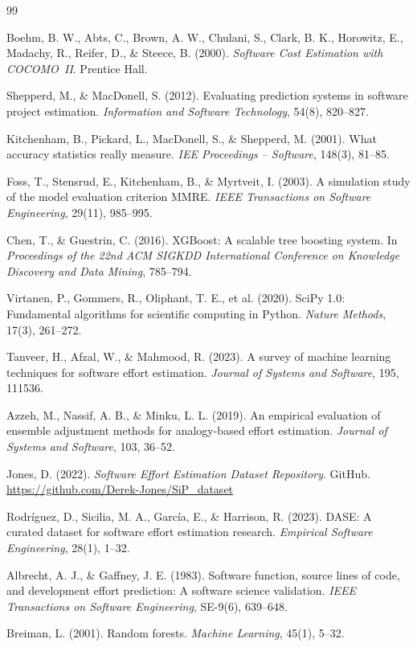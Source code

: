 \documentclass[12pt,a4paper]{article}
\begin{document}
\begin{thebibliography}{99}

Boehm, B. W., Abts, C., Brown, A. W., Chulani, S., Clark, B. K., Horowitz, E., Madachy, R., Reifer, D., \& Steece, B. (2000). \textit{Software Cost Estimation with COCOMO~II}. Prentice Hall.

Shepperd, M., \& MacDonell, S. (2012). Evaluating prediction systems in software project estimation. \textit{Information and Software Technology}, 54(8), 820--827.

Kitchenham, B., Pickard, L., MacDonell, S., \& Shepperd, M. (2001). What accuracy statistics really measure. \textit{IEE Proceedings -- Software}, 148(3), 81--85.

Foss, T., Stensrud, E., Kitchenham, B., \& Myrtveit, I. (2003). A simulation study of the model evaluation criterion MMRE. \textit{IEEE Transactions on Software Engineering}, 29(11), 985--995.

Chen, T., \& Guestrin, C. (2016). XGBoost: A scalable tree boosting system. In \textit{Proceedings of the 22nd ACM SIGKDD International Conference on Knowledge Discovery and Data Mining}, 785--794.

Virtanen, P., Gommers, R., Oliphant, T. E., et al. (2020). SciPy 1.0: Fundamental algorithms for scientific computing in Python. \textit{Nature Methods}, 17(3), 261--272.

Tanveer, H., Afzal, W., \& Mahmood, R. (2023). A survey of machine learning techniques for software effort estimation. \textit{Journal of Systems and Software}, 195, 111536.

Azzeh, M., Nassif, A. B., \& Minku, L. L. (2019). An empirical evaluation of ensemble adjustment methods for analogy-based effort estimation. \textit{Journal of Systems and Software}, 103, 36--52.

Jones, D. (2022). \textit{Software Effort Estimation Dataset Repository}. GitHub. \url{https://github.com/Derek-Jones/SiP\_dataset}

Rodríguez, D., Sicilia, M. A., García, E., \& Harrison, R. (2023). DASE: A curated dataset for software effort estimation research. \textit{Empirical Software Engineering}, 28(1), 1--32.

Albrecht, A. J., \& Gaffney, J. E. (1983). Software function, source lines of code, and development effort prediction: A software science validation. \textit{IEEE Transactions on Software Engineering}, SE-9(6), 639--648.

Breiman, L. (2001). Random forests. \textit{Machine Learning}, 45(1), 5--32.

\end{thebibliography}
\end{document}
